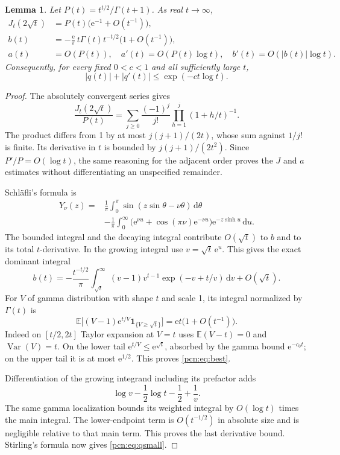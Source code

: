 \documentclass[11pt,letterpaper]{article}
\newtheorem{lemma}[theorem]{Lemma}
\theoremstyle{remark}\newtheorem{remark}[theorem]{Remark}
\newcommand{\E}{\mathbb E}
\newcommand{\dd}{\,\mathrm d}
\newcommand{\ee}{\mathrm e}
\newcommand{\Var}{\operatorname{Var}}
\begin{document}
\begin{lemma}\label{pcn:lem:largeorder}
Let $P(t)=t^{t/2}/\Gamma(t+1)$. As real $t\to\infty$,
\begin{align}
 J_t(2\sqrt t)&=P(t)\bigl(\ee^{-1}+O(t^{-1})\bigr),\label{pcn:eq:Jest}\\
 b(t)&=-\frac{\ee}{\pi}\,t\Gamma(t)t^{-t/2}\bigl(1+O(t^{-1})\bigr),\label{pcn:eq:best}\\
 a(t)&=O(P(t)),\quad a'(t)=O(P(t)\log t),\quad
 b'(t)=O(|b(t)|\log t).\label{pcn:eq:derivs}
\end{align}
Consequently, for every fixed $0<c<1$ and all sufficiently large $t$,
\begin{equation}\label{pcn:eq:qsmall}
 |q(t)|+|q'(t)|\le\exp(-ct\log t).
\end{equation}
\end{lemma}
\begin{proof}
The absolutely convergent series gives
\[
 \frac{J_t(2\sqrt t)}{P(t)}
 =\sum_{j\ge0}\frac{(-1)^j}{j!}
                 \prod_{h=1}^j(1+h/t)^{-1}.
\]
The product differs from 1 by at most $j(j+1)/(2t)$, whose sum against $1/j!$ is finite. Its derivative in $t$ is bounded by $j(j+1)/(2t^2)$. Since $P'/P=O(\log t)$, the same reasoning for the adjacent order proves the $J$ and $a$ estimates without differentiating an unspecified remainder.

Schl\"afli's formula \cite[10.9.7]{DLMF} is
\begin{align*}
 Y_\nu(z)={}&\frac1\pi\int_0^\pi\sin(z\sin\theta-\nu\theta)\dd\theta\\
 &-\frac1\pi\int_0^\infty
       \bigl(\ee^{\nu u}+\cos(\pi\nu)\ee^{-\nu u}\bigr)
                                      \ee^{-z\sinh u}\dd u.
\end{align*}
The bounded integral and the decaying integral contribute $O(\sqrt t)$ to $b$ and to its total $t$-derivative. In the growing integral use $v=\sqrt t\,\ee^u$. This gives the exact dominant integral
\begin{equation}\label{pcn:eq:bint}
 b(t)=-\frac{t^{-t/2}}\pi
 \int_{\sqrt t}^\infty(v-1)v^{t-1}\exp(-v+t/v)\dd v+O(\sqrt t).
\end{equation}
For $V$ of gamma distribution with shape $t$ and scale 1, its integral normalized by $\Gamma(t)$ is
\[
 \E\bigl[(V-1)\ee^{t/V}\mathbf1_{\{V\ge\sqrt t\}}\bigr]
       =\ee t\bigl(1+O(t^{-1})\bigr).
\]
Indeed on $[t/2,2t]$ Taylor expansion at $V=t$ uses $\E(V-t)=0$ and $\Var(V)=t$. On the lower tail $\ee^{t/V}\le\ee^{\sqrt t}$, absorbed by the gamma bound $\ee^{-c_0t}$; on the upper tail it is at most $\ee^{1/2}$. This proves \eqref{pcn:eq:best}.

Differentiation of the growing integrand including its prefactor adds
\[
 \log v-\frac12\log t-\frac12+\frac1v.
\]
The same gamma localization bounds its weighted integral by $O(\log t)$ times the main integral. The lower-endpoint term is $O(t^{-1/2})$ in absolute size and is negligible relative to that main term. This proves the last derivative bound. Stirling's formula now gives \eqref{pcn:eq:qsmall}.
\end{proof}
\end{document}
